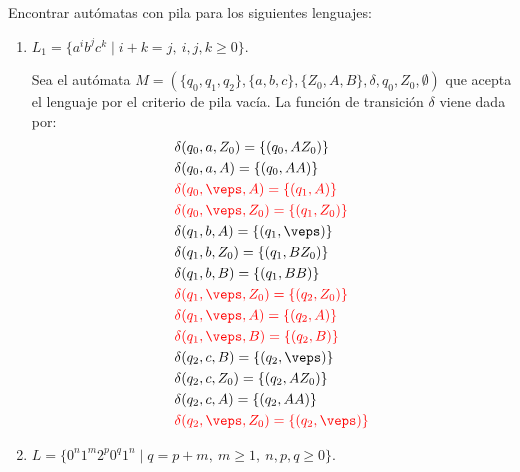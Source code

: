 \begin{ejercicio}\label{ej:1.5.16}
    Encontrar autómatas con pila para los siguientes lenguajes:
    \begin{enumerate}
        \item $L_1 = \{a^i b^j c^k \mid i+k = j,\ i,j,k\geq 0\}$.
        
        Sea el autómata $M = (\{q_0,q_1,q_2\},\{a,b,c\},\{Z_0,A,B\},\delta,q_0,Z_0,\emptyset)$ que acepta el lenguaje por el criterio de pila vacía. La función de transición $\delta$ viene dada por:
        \begin{align*}
            &\delta(q_0,a,Z_0) = \{(q_0,AZ_0)\} \\
            &\delta(q_0,a,A) = \{(q_0,AA)\} \\
            &\red{\delta(q_0,\veps,A) = \{(q_1,A)\}} \\
            &\red{\delta(q_0,\veps,Z_0) = \{(q_1,Z_0)\}} \\
            &\delta(q_1,b,A) = \{(q_1,\veps)\} \\
            &\delta(q_1,b,Z_0) = \{(q_1,BZ_0)\} \\
            &\delta(q_1,b,B) = \{(q_1,BB)\} \\
            &\red{\delta(q_1,\veps,Z_0) = \{(q_2,Z_0)\}} \\
            &\red{\delta(q_1,\veps,A) = \{(q_2,A)\}} \\
            &\red{\delta(q_1,\veps,B) = \{(q_2,B)\}} \\
            &\delta(q_2,c,B) = \{(q_2,\veps)\} \\
            &\delta(q_2,c,Z_0) = \{(q_2,AZ_0)\} \\
            &\delta(q_2,c,A) = \{(q_2,AA)\} \\
            &\red{\delta(q_2,\veps,Z_0) = \{(q_2,\veps)\}}
        \end{align*}

        \item $L = \{0^n 1^m 2^p 0^q 1^n \mid q = p + m,\ m\geq 1,\ n,p,q\geq 0\}$.
        

\end{enumerate}
\end{ejercicio}
